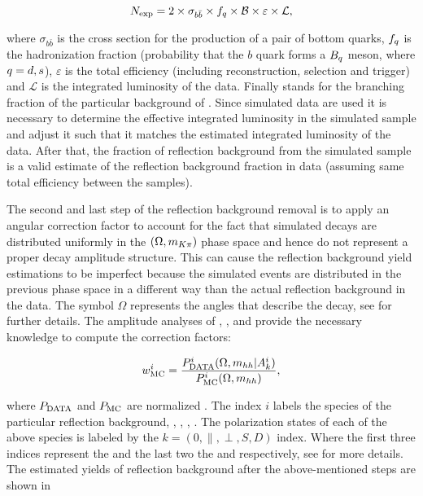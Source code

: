 \begin{equation}
N_{\rm exp} = 2 \times \sigma_{b\bar{b}}\times f_q \times {\ensuremath{\cal B}} \times \varepsilon \times {\mathcal{L}},
\end{equation}

\noindent where $\sigma_{b\bar{b}}$ is the cross section for the production of a pair of bottom quarks, $f_q$ is the hadronization fraction
(probability that the $b$ quark forms a $B_q$ meson, where $q=d,s$), $\varepsilon$ is the total efficiency (including reconstruction,
selection and trigger) and ${\mathcal{L}}$ is the integrated luminosity of the data. Finally \BF stands for the branching fraction
of the particular background of . Since simulated data are used it is necessary to determine
the effective integrated luminosity in the simulated sample and adjust it such that it matches the estimated integrated
luminosity of the data. After that, the fraction of reflection background from the simulated sample is a valid estimate
of the reflection background fraction in data (assuming same total efficiency between the samples).

The second and last step of the reflection background removal is to apply an angular correction factor to account for
the fact that simulated decays are distributed uniformly in the $(\Omega, m_{K\pi})$ phase space and hence do not
represent a proper decay amplitude structure. This can cause the reflection background yield estimations to be
imperfect because the simulated events are distributed in the previous phase space in a different way than the
actual reflection background in the data. The symbol $\Omega$ represents the angles that describe the \BsJpsiKst
decay, see  for further details. The amplitude analyses of \BdJpsipipi \cite{SheldonBdpipi},
\BsJpsipipi \cite{SheldonBspipi}, \BsJpsiKK \cite{SheldonKK} and \LbJpsipK \cite{Gao:1701984} provide the necessary
knowledge to compute the correction factors:

\begin{equation}
\centering
w_{\rm MC}^i = \frac{P_{\rm DATA}^i (\Omega, \mhh  | A_k^i)} {P_{\rm MC}^i(\Omega, \mhh)},
\end{equation}

\noindent where $P_{\rm DATA}$ and $P_{\rm MC}$ are normalized \pdfs.
The index $i$ labels the species of the particular reflection background, \ie \BdJpsipipi, \BsJpsipipi, \BsJpsiKK, \LbJpsipK.
The polarization states of each of the above species is labeled by the $k=\left(0, \parallel, \perp, S, D \right)$ index.
Where the first three indices represent the \pwave and the last two the \swave and \dwave respectively,
see  for more details. The estimated yields of reflection background after
the above-mentioned steps are shown in 

